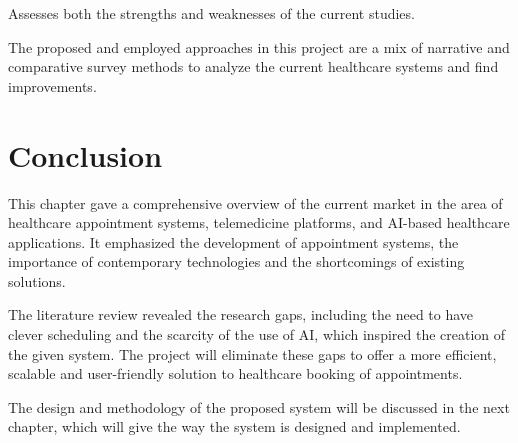 Assesses both the strengths and weaknesses of the current studies.

The proposed and employed approaches in this project are a mix of narrative and comparative survey methods to analyze the current healthcare systems and find improvements.

\section{Conclusion}

This chapter gave a comprehensive overview of the current market in the area of healthcare appointment systems, telemedicine platforms, and AI-based healthcare applications. It emphasized the development of appointment systems, the importance of contemporary technologies and the shortcomings of existing solutions.

The literature review revealed the research gaps, including the need to have clever scheduling and the scarcity of the use of AI, which inspired the creation of the given system. The project will eliminate these gaps to offer a more efficient, scalable and user-friendly solution to healthcare booking of appointments.

The design and methodology of the proposed system will be discussed in the next chapter, which will give the way the system is designed and implemented.
